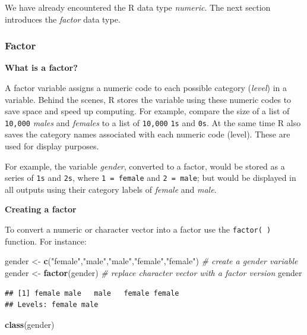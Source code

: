 \documentclass[]{book}
\newenvironment{Shaded}{\begin{snugshade}}{\end{snugshade}}
\newcommand{\KeywordTok}[1]{\textcolor[rgb]{0.13,0.29,0.53}{\textbf{#1}}}
\newcommand{\StringTok}[1]{\textcolor[rgb]{0.31,0.60,0.02}{#1}}
\newcommand{\CommentTok}[1]{\textcolor[rgb]{0.56,0.35,0.01}{\textit{#1}}}
\newcommand{\NormalTok}[1]{#1}
\begin{document}
We have already encountered the R data type \emph{numeric}. The next
section introduces the \emph{factor} data type.

\subsubsection{Factor}\label{factor}

\textbf{What is a factor?}

A factor variable assigns a numeric code to each possible category
(\emph{level}) in a variable. Behind the scenes, R stores the variable
using these numeric codes to save space and speed up computing. For
example, compare the size of a list of \texttt{10,000} \emph{males} and
\emph{females} to a list of \texttt{10,000} \texttt{1s} and \texttt{0s}.
At the same time R also saves the category names associated with each
numeric code (level). These are used for display purposes.

For example, the variable \emph{gender}, converted to a factor, would be
stored as a series of \texttt{1s} and \texttt{2s}, where
\texttt{1\ =\ female} and \texttt{2\ =\ male}; but would be displayed in
all outputs using their category labels of \emph{female} and
\emph{male}.

\textbf{Creating a factor}

To convert a numeric or character vector into a factor use the
\texttt{factor(\ )} function. For instance:

\begin{Shaded}
\begin{Highlighting}[]
\NormalTok{gender <-}\StringTok{ }\KeywordTok{c}\NormalTok{(}\StringTok{"female"}\NormalTok{,}\StringTok{"male"}\NormalTok{,}\StringTok{"male"}\NormalTok{,}\StringTok{"female"}\NormalTok{,}\StringTok{"female"}\NormalTok{) }\CommentTok{# create a gender variable}
\NormalTok{gender <-}\StringTok{ }\KeywordTok{factor}\NormalTok{(gender) }\CommentTok{# replace character vector with a factor version}
\NormalTok{gender}
\end{Highlighting}
\end{Shaded}

\begin{verbatim}
## [1] female male   male   female female
## Levels: female male
\end{verbatim}

\begin{Shaded}
\begin{Highlighting}[]
\KeywordTok{class}\NormalTok{(gender)}
\end{Highlighting}
\end{Shaded}
\end{document}
